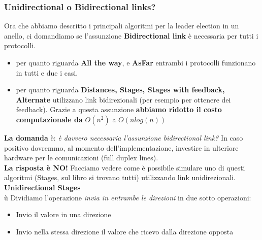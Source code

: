 \documentclass[12pt]{article}
\begin{document}
		\subsubsection{Unidirectional o Bidirectional links?}
			Ora che abbiamo descritto i principali algoritmi per la leader election in un anello, ci domandiamo se l'assunzione \textbf{Bidirectional link} è necessaria per tutti i protocolli.
			\begin{itemize}
				\item per quanto riguarda \textbf{All the way}, e \textbf{AsFar} entrambi i protocolli funzionano in tutti e due i casi.
				\item per quanto riguarda \textbf{Distances, Stages, Stages with feedback, Alternate} utilizzano link bidirezionali (per esempio per ottenere dei feedback). Grazie a questa assunzione \textbf{abbiamo ridotto il costo computazionale da} $O(n^2)$ a $O(nlog(n))$
			\end{itemize}
			\textbf{La domanda} è: \textit{è davvero necessaria l'assunzione bidirectional link?}
			In caso positivo dovremmo, al momento dell'implementazione, investire in ulteriore hardware per le comunicazioni (full duplex lines).\\
			\textbf{La risposta è NO!}
			Facciamo vedere come è possibile simulare uno di questi algoritmi (Stages, sul libro si trovano tutti) utilizzando link unidirezionali.
			\textbf{Unidirectional Stages}\\ù
			Dividiamo l'operazione \textit{invia in entrambe le direzioni} in due sotto operazioni:
			\begin{itemize}
				\item Invio il valore in una direzione
				\item Invio nella stessa direzione il valore che ricevo dalla direzione opposta
			\end{itemize}
\end{document}
